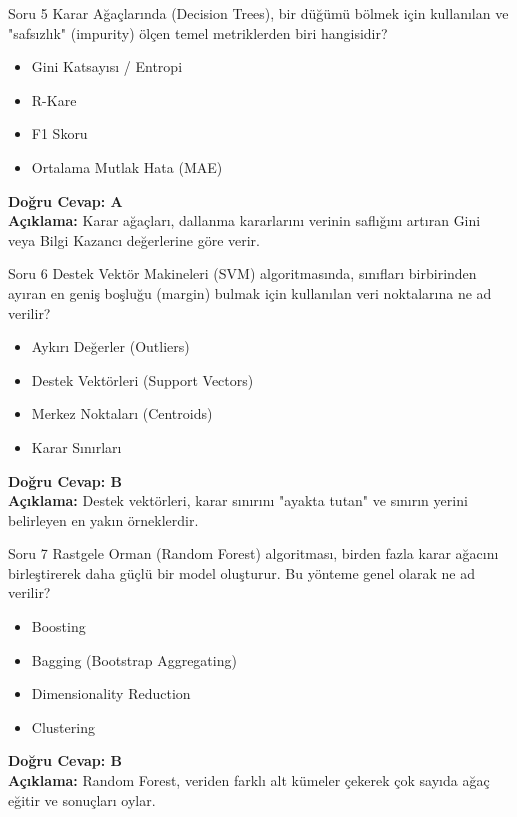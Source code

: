 \documentclass[12pt,a4paper]{article}
\begin{document}
\begin{testcard}{Soru 5}
    Karar Ağaçlarında (Decision Trees), bir düğümü bölmek için kullanılan ve "safsızlık" (impurity) ölçen temel metriklerden biri hangisidir?
    \begin{itemize}
        \item[A)] Gini Katsayısı / Entropi
        \item[B)] R-Kare
        \item[C)] F1 Skoru
        \item[D)] Ortalama Mutlak Hata (MAE)
    \end{itemize}
    \tcblower
    \textbf{Doğru Cevap: A} \\
    \textbf{Açıklama:} Karar ağaçları, dallanma kararlarını verinin saflığını artıran Gini veya Bilgi Kazancı değerlerine göre verir.
\end{testcard}

\begin{testcard}{Soru 6}
    Destek Vektör Makineleri (SVM) algoritmasında, sınıfları birbirinden ayıran en geniş boşluğu (margin) bulmak için kullanılan veri noktalarına ne ad verilir?
    \begin{itemize}
        \item[A)] Aykırı Değerler (Outliers)
        \item[B)] Destek Vektörleri (Support Vectors)
        \item[C)] Merkez Noktaları (Centroids)
        \item[D)] Karar Sınırları
    \end{itemize}
    \tcblower
    \textbf{Doğru Cevap: B} \\
    \textbf{Açıklama:} Destek vektörleri, karar sınırını "ayakta tutan" ve sınırın yerini belirleyen en yakın örneklerdir.
\end{testcard}

\begin{testcard}{Soru 7}
    Rastgele Orman (Random Forest) algoritması, birden fazla karar ağacını birleştirerek daha güçlü bir model oluşturur. Bu yönteme genel olarak ne ad verilir?
    \begin{itemize}
        \item[A)] Boosting
        \item[B)] Bagging (Bootstrap Aggregating)
        \item[C)] Dimensionality Reduction
        \item[D)] Clustering
    \end{itemize}
    \tcblower
    \textbf{Doğru Cevap: B} \\
    \textbf{Açıklama:} Random Forest, veriden farklı alt kümeler çekerek çok sayıda ağaç eğitir ve sonuçları oylar.
\end{testcard}
\end{document}
